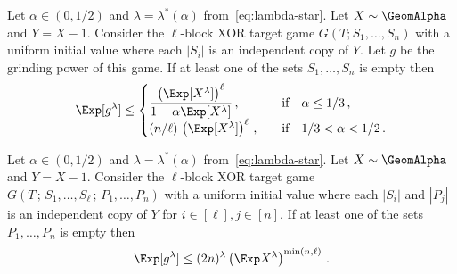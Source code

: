 \begin{lemma}\label{lemma:xor-game-block-moment-bound}
Let $\alpha \in (0, 1/2)$ and $\lambda = \lambda^*(\alpha)$ from~\eqref{eq:lambda-star}. 
Let $X \sim \GeomAlpha$ and $Y = X - 1$.
Consider the $\ell$-block XOR target game $G(T; S_1, \ldots, S_n)$ 
with a uniform initial value where each $|S_i|$ is an independent copy of $Y$. 
Let $g$ be the grinding power of this game. 
If at least one of the sets $S_1, \ldots, S_n$ is empty then
\[
    \Exp[g^{\lambda}] \leq \begin{cases}
        \dfrac{\left(\Exp[X^\lambda]\right)^\ell}{1 - \alpha \Exp[X^\lambda]}
            \,, &\quad\text{if}\quad \alpha \leq 1/3\,, \\
        (n/\ell)\,\left(\Exp[X^\lambda]\right)^\ell
            \,, &\quad\text{if}\quad 1/3 < \alpha < 1/2\,.
    \end{cases}
\]

\end{lemma}


\begin{lemma}\label{lemma:xor-game-lookahead-moment}
Let $\alpha \in (0, 1/2)$ and $\lambda = \lambda^*(\alpha)$ from~\eqref{eq:lambda-star}. 
Let $X \sim \GeomAlpha$ and $Y = X - 1$.
Consider the $\ell$-block XOR target game $G(T\,;\, S_1, \ldots, S_\ell\,;\, P_1, \ldots, P_n)$ 
with a uniform initial value where 
each $|S_i|$ and $|P_j|$ 
is an independent copy of $Y$ for $i \in [\ell], j \in [n]$.
If at least one of the sets $P_1, \ldots, P_n$ is empty then 
\[
    \Exp[g^\lambda] \leq 
        (2n)^{\lambda} 
        \left(\Exp X^\lambda \right)^{\min(n, \ell)}
    \,.
\]
\end{lemma}

